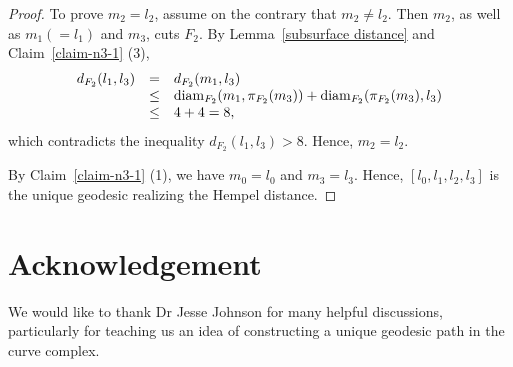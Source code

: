 \documentclass[]{aspm}
\begin{document}
\begin{proof}
To prove $m_2=l_2$, assume on the contrary that $m_2\ne l_2$. 
Then $m_2$, as well as $m_1(=l_1)$ and $m_3$, cuts $F_2$.
By Lemma~\ref{subsurface distance} and Claim~\ref{claim-n3-1} (3), 
\begin{eqnarray}\label{eqn-5-3}
\begin{array}{rcl}
d_{F_2}(l_1,l_3)&=&d_{F_2}(m_1,l_3)\\
&\leq&{\rm diam}_{F_2}(m_1,\pi_{F_2}(m_3))+{\rm diam}_{F_2}(\pi_{F_2}(m_3), l_3)\\
&\leq&4+4=8,
\end{array}
\end{eqnarray}
which contradicts the inequality $d_{F_2}(l_1,l_3)>8$. 
Hence, $m_2=l_2$.

By Claim~\ref{claim-n3-1} (1), we have $m_0=l_0$ and $m_3=l_3$.
Hence, $[l_0,l_1,l_2,l_3]$ is the unique geodesic realizing the Hempel distance. 
\end{proof}


\section*{Acknowledgement}
We would like to thank Dr Jesse Johnson for many helpful discussions, particularly for teaching us an idea of constructing a unique geodesic path in the curve complex. 
\end{document}
